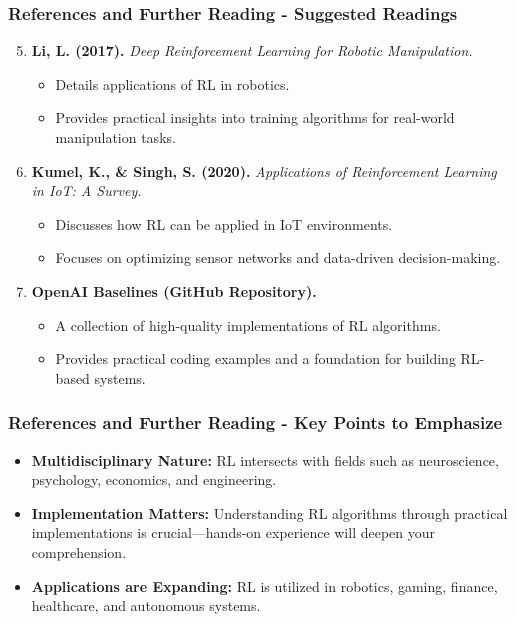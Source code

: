 \documentclass[aspectratio=169]{beamer}
\begin{document}
\begin{frame}[fragile]
  \frametitle{References and Further Reading - Suggested Readings}
  
  \begin{enumerate}
    \setcounter{enumi}{4} %
    \item \textbf{Li, L. (2017).}
    \textit{Deep Reinforcement Learning for Robotic Manipulation.}
    \begin{itemize}
        \item Details applications of RL in robotics.
        \item Provides practical insights into training algorithms for real-world manipulation tasks.
    \end{itemize}
    
    \item \textbf{Kumel, K., \& Singh, S. (2020).}
    \textit{Applications of Reinforcement Learning in IoT: A Survey.}
    \begin{itemize}
        \item Discusses how RL can be applied in IoT environments.
        \item Focuses on optimizing sensor networks and data-driven decision-making.
    \end{itemize}

    \item \textbf{OpenAI Baselines (GitHub Repository).}
    \begin{itemize}
        \item A collection of high-quality implementations of RL algorithms.
        \item Provides practical coding examples and a foundation for building RL-based systems.
    \end{itemize}
  \end{enumerate}
  
\end{frame}

\begin{frame}[fragile]
  \frametitle{References and Further Reading - Key Points to Emphasize}
  
  \begin{itemize}
    \item \textbf{Multidisciplinary Nature:} 
    RL intersects with fields such as neuroscience, psychology, economics, and engineering.
    \item \textbf{Implementation Matters:} 
    Understanding RL algorithms through practical implementations is crucial—hands-on experience will deepen your comprehension.
    \item \textbf{Applications are Expanding:} 
    RL is utilized in robotics, gaming, finance, healthcare, and autonomous systems.
  \end{itemize}

\end{frame}
\end{document}
